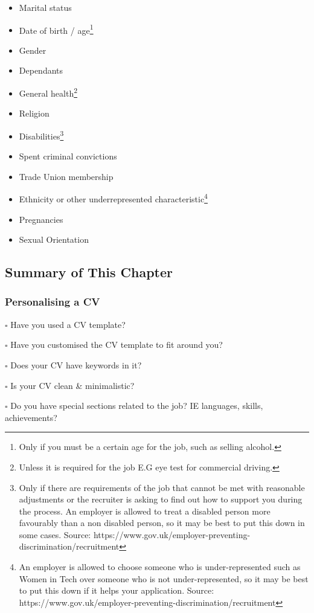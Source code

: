 \documentclass{article}
\begin{document}
\begin{itemize}
\item
  Marital status
\item
  Date of birth / age\footnote{Only if you must be a certain age for the
    job, such as selling alcohol.}
\item
  Gender
\item
  Dependants
\item
  General health\footnote{Unless it is required for the job E.G eye test
    for commercial driving.}
\item
  Religion
\item
  Disabilities\footnote{Only if there are requirements of the job that
    cannot be met with reasonable adjustments or the recruiter is asking
    to find out how to support you during the process. An employer is
    allowed to treat a disabled person more favourably than a non
    disabled person, so it may be best to put this down in some cases.
    Source:
    https://www.gov.uk/employer-preventing-discrimination/recruitment}
\item
  Spent criminal convictions
\item
  Trade Union membership
\item
  Ethnicity or other underrepresented characteristic\footnote{An
    employer is allowed to choose someone who is under-represented such
    as Women in Tech over someone who is not under-represented, so it
    may be best to put this down if it helps your application. Source:
    https://www.gov.uk/employer-preventing-discrimination/recruitment}
\item
  Pregnancies
\item
  Sexual Orientation
\end{itemize}
\subsection{Summary of This Chapter}
\subsubsection{Personalising a CV}

$\square$ Have you used a CV template?

$\square$ Have you customised the CV template to fit around you?

$\square$ Does your CV have keywords in it?

$\square$ Is your CV clean \& minimalistic?

$\square$ Do you have special sections related to the job? IE languages, skills,
achievements?
\end{document}
